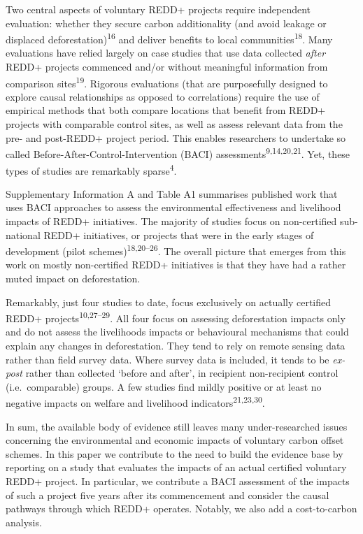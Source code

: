 \documentclass[
]{article}
\begin{document}
Two central aspects of voluntary REDD+ projects require independent
evaluation: whether they secure carbon additionality (and avoid leakage
or displaced deforestation)\textsuperscript{16} and deliver benefits to
local communities\textsuperscript{18}. Many evaluations have relied
largely on case studies that use data collected \emph{after} REDD+
projects commenced and/or without meaningful information from comparison
sites\textsuperscript{19}. Rigorous evaluations (that are purposefully
designed to explore causal relationships as opposed to correlations)
require the use of empirical methods that both compare locations that
benefit from REDD+ projects with comparable control sites, as well as
assess relevant data from the pre- and post-REDD+ project period. This
enables researchers to undertake so called
Before-After-Control-Intervention (BACI)
assessments\textsuperscript{9,14,20,21}. Yet, these types of studies are
remarkably sparse\textsuperscript{4}.

Supplementary Information A and Table A1 summarises published work that
uses BACI approaches to assess the environmental effectiveness and
livelihood impacts of REDD+ initiatives. The majority of studies focus
on non-certified sub-national REDD+ initiatives, or projects that were
in the early stages of development (pilot
schemes)\textsuperscript{18,20--26}. The overall picture that emerges
from this work on mostly non-certified REDD+ initiatives is that they
have had a rather muted impact on deforestation.

Remarkably, just four studies to date, focus exclusively on actually
certified REDD+ projects\textsuperscript{10,27--29}. All four focus on
assessing deforestation impacts only and do not assess the livelihoods
impacts or behavioural mechanisms that could explain any changes in
deforestation. They tend to rely on remote sensing data rather than
field survey data. Where survey data is included, it tends to be
\emph{ex-post} rather than collected `before and after', in recipient
non-recipient control (i.e.~comparable) groups. A few studies find
mildly positive or at least no negative impacts on welfare and
livelihood indicators\textsuperscript{21,23,30}.

In sum, the available body of evidence still leaves many
under-researched issues concerning the environmental and economic
impacts of voluntary carbon offset schemes. In this paper we contribute
to the need to build the evidence base by reporting on a study that
evaluates the impacts of an actual certified voluntary REDD+ project. In
particular, we contribute a BACI assessment of the impacts of such a
project five years after its commencement and consider the causal
pathways through which REDD+ operates. Notably, we also add a
cost-to-carbon analysis.
\end{document}
